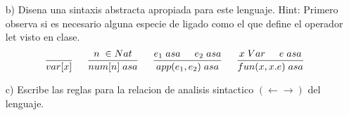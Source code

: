 \documentclass{article}
\begin{document}
\begin{itemize}
\begin{itemize}
                \item[b)] Disena una sintaxis abstracta apropiada para este lenguaje.
                Hint: Primero observa si es necesario alguna especie de ligado como el que define el operador let visto en clase.\\

                $$
                \frac{}{var[x]}\hspace{0.5cm}\frac{n\hspace{0.1cm}\in Nat}{num[n]\hspace{0.1cm}asa}\hspace{0.5cm}\frac{e_1\hspace{0.1cm}asa\hspace{0.5cm}e_2\hspace{0.1cm}asa}{app(e_1,e_2)\hspace{0.1cm}asa}\hspace{0.5cm}\frac{x\hspace{0.1cm}Var\hspace{0.5cm}e\hspace{0.1cm}asa}{fun(x,x.e)\hspace{0.1cm}asa}
                $$
                
                \item[c)] Escribe las reglas para la relacion de analisis sintactico $(\leftarrow\rightarrow)$ del lenguaje.\\


\end{itemize}
\end{itemize}
\end{document}
